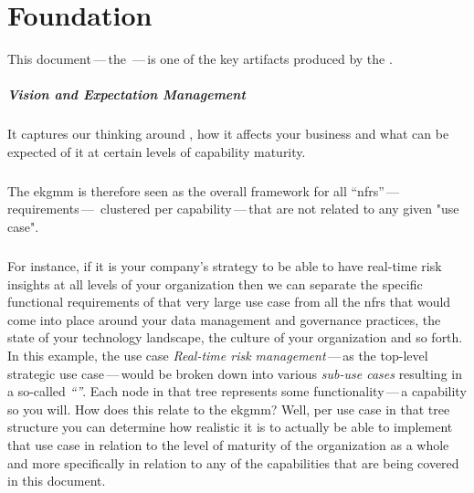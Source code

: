 \chapter{ Foundation}
\label{ch:ekg-foundation}

This document\,---\,the \,---\,is one of the key artifacts produced by the .

\paragraph{Vision and Expectation Management}

It captures our thinking around ,
how it affects your business and what can be expected of it at certain levels of capability maturity.

\paragraph{}

The \gls{ekgmm} is therefore seen as the overall framework for all \enquote{\glspl{nfr}}\,---\,requirements\,---\,%
clustered per capability\,---\,that are not  related to any given "use case".

\paragraph{}

For instance, if it is your company's strategy to be able to have real-time risk insights at all levels
of your organization then we can separate the specific functional requirements of that very large use case from
all the \glspl{nfr} that would come into place around your data management and governance practices, the state of
your technology landscape, the culture of your organization and so forth.
In this example, the use case \textit{Real-time risk management}\,---\,as the top-level strategic use case\,---\,would
be broken down into various \textit{sub-use cases} resulting in a so-called \textit{\enquote{}}.
Each node in that tree represents some functionality\,---\,a capability so you will.
How does this relate to the \gls{ekgmm}? Well, per use case in that tree structure you can determine how realistic
it is to actually be able to implement that use case in relation to the level of maturity of the organization as a
whole and more specifically in relation to any of the capabilities that are being covered in this document.

